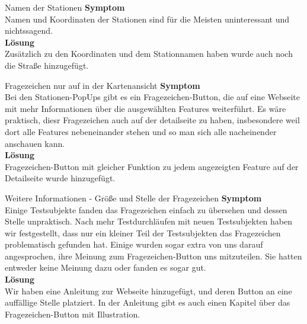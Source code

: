     \begin{Bug}{Namen der Stationen}
      \textbf{Symptom}\\
      Namen und Koordinaten der Stationen sind für die Meisten uninteressant und nichtssagend.\\
      \linebreak
      \textbf{Lösung}\\
      Zusätzlich zu den Koordinaten und dem Stationnamen haben wurde auch noch die Straße hinzugefügt.\\
    \end{Bug}

    \begin{Bug}{Fragezeichen nur auf in der Kartenansicht}
      \textbf{Symptom}\\
      Bei den Stationen-PopUps gibt es ein Fragezeichen-Button, die auf eine Webseite mit mehr Informationen über die ausgewählten Features weiterführt. Es wäre praktisch, diesr Fragezeichen auch auf der detailseite zu haben, insbesondere weil dort alle Features nebeneinander stehen und so man sich alle nacheinender anschauen kann.\\
      \linebreak
      \textbf{Lösung}\\
      Fragezeichen-Button mit gleicher Funktion zu jedem angezeigten Feature auf der Detailseite wurde hinzugefügt.\\
    \end{Bug}
    
    \begin{Bug}{Weitere Informationen - Größe und Stelle der Fragezeichen}
      \textbf{Symptom}\\
      Einige Testsubjekte fanden das Fragezeichen einfach zu übersehen und dessen Stelle unpraktisch. Nach mehr Testdurchläufen mit neuen Testsubjekten haben wir festgestellt, dass nur ein kleiner Teil der Testsubjekten das Fragezeichen problematisch gefunden hat. Einige wurden sogar extra von uns darauf angesprochen, ihre Meinung zum Fragezeichen-Button uns mitzuteilen. Sie hatten entweder keine Meinung dazu oder fanden es sogar gut.\\
      \linebreak
      \textbf{Lösung}\\
      Wir haben eine Anleitung zur Webseite hinzugefügt, und deren Button an eine auffällige Stelle platziert. In der Anleitung gibt es auch einen Kapitel über das Fragezeichen-Button mit Illustration. \\
    \end{Bug}

